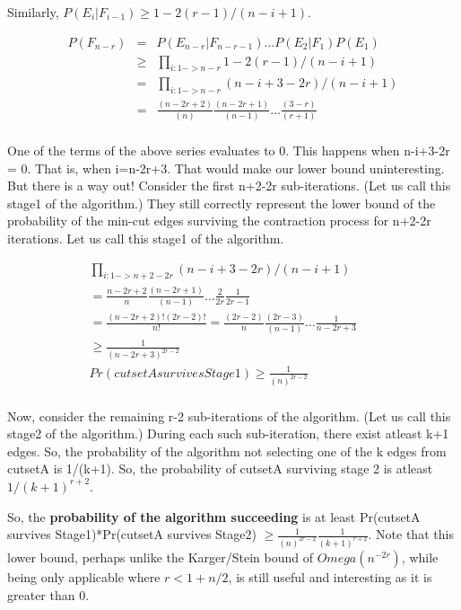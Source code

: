 \documentclass[10pt]{article}
\begin{document}
Similarly, $P(E_{i}|F_{i-1})\geq 1-2(r-1)/(n-i+1)$.

\begin{eqnarray}
P(F_{n-r}) &=& P(E_{n-r}|F_{n-r-1})...P(E_{2}|F_{1})P(E_{1})\\
&\geq& \prod_{i:1->n-r} 1-2(r-1)/(n-i+1)\\
&=& \prod_{i:1->n-r} (n-i+3-2r)/(n-i+1)\\
&=& \frac{(n-2r+2)}{(n)} \frac{(n-2r+1)}{(n-1)}...\frac{(3-r)}{(r+1)}\\
\end{eqnarray}

One of the terms of the above series evaluates to 0. This happens when n-i+3-2r = 0. That is, when i=n-2r+3. That would make our lower bound uninteresting. But there is a way out! Consider the first n+2-2r sub-iterations. (Let us call this stage1 of the algorithm.) They still correctly represent the lower bound of the probability of the min-cut edges surviving the contraction process for n+2-2r iterations. Let us call this stage1 of the algorithm.

\begin{eqnarray}
\prod_{i:1->n+2-2r} (n-i+3-2r)/(n-i+1) && \\
= \frac{n-2r+2}{n} \frac{(n-2r+1)}{(n-1)}... \frac{2}{2r} \frac{1}{2r-1}&& \\
= \frac{(n-2r+2)!(2r-2)!}{n!}
= \frac{(2r-2)}{n} \frac{(2r-3)}{(n-1)}... \frac{1}{n-2r+3}&& \\
\geq \frac{1}{(n-2r+3)^{2r-2}}&& \\
Pr(cutsetAsurvivesStage1) \geq \frac{1}{(n)^{2r-2}}&& \\
\end{eqnarray}

Now, consider the remaining r-2 sub-iterations of the algorithm. (Let us call this stage2 of the algorithm.) During each such sub-iteration, there exist atleast k+1 edges. So, the probability of the algorithm not selecting one of the k edges from cutsetA is 1/(k+1). So, the probability of cutsetA surviving stage 2 is atleast $1/(k+1)^{r+2}$.

So, the \textbf{probability of the algorithm succeeding} is at least Pr(cutsetA survives Stage1)*Pr(cutsetA survives Stage2) $\geq \frac{1}{(n)^{2r-2}}\frac{1}{(k+1)^{r+2}}$. Note that this lower bound, perhaps unlike the Karger/Stein bound of $Omega(n^{-2r})$, while being only applicable where $r < 1+n/2$, is still useful and interesting as it is greater than 0.
\end{document}
